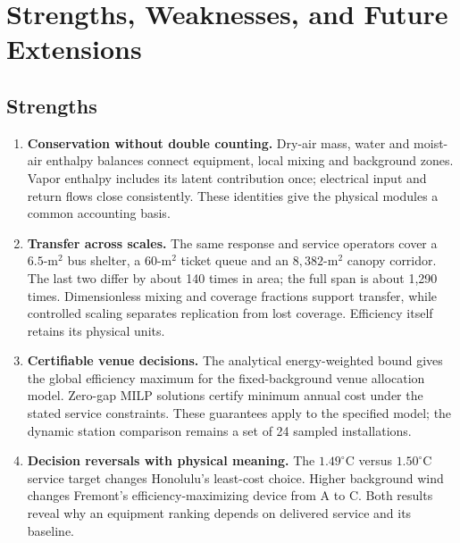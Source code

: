 \clearpage
\section[Strengths, weaknesses and extensions]{Strengths, Weaknesses, and Future Extensions}
\label{sec:evaluation}
\begingroup\small
\subsection*{Strengths}
\begin{enumerate}[leftmargin=*,itemsep=3pt,topsep=2pt,parsep=0pt]
\item \textbf{Conservation without double counting.} Dry-air mass, water and moist-air enthalpy balances connect equipment, local mixing and background zones. Vapor enthalpy includes its latent contribution once; electrical input and return flows close consistently. These identities give the physical modules a common accounting basis.
\item \textbf{Transfer across scales.} The same response and service operators cover a $6.5$-m$^2$ bus shelter, a $60$-m$^2$ ticket queue and an $8{,}382$-m$^2$ canopy corridor. The last two differ by about 140 times in area; the full span is about 1,290 times. Dimensionless mixing and coverage fractions support transfer, while controlled scaling separates replication from lost coverage. Efficiency itself retains its physical units.
\item \textbf{Certifiable venue decisions.} The analytical energy-weighted bound gives the global efficiency maximum for the fixed-background venue allocation model. Zero-gap MILP solutions certify minimum annual cost under the stated service constraints. These guarantees apply to the specified model; the dynamic station comparison remains a set of 24 sampled installations.
\item \textbf{Decision reversals with physical meaning.} The $1.49^\circ$C versus $1.50^\circ$C service target changes Honolulu's least-cost choice. Higher background wind changes Fremont's efficiency-maximizing device from A to C. Both results reveal why an equipment ranking depends on delivered service and its baseline.
\end{enumerate}
